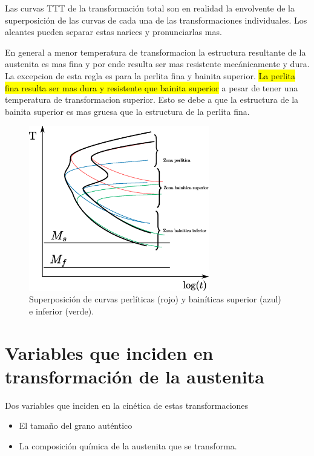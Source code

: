 \documentclass{article}
\begin{document}
Las curvas TTT de la transformación total son en realidad la envolvente de la superposición de las curvas de cada una de las transformaciones individuales. Los aleantes pueden separar estas narices y pronunciarlas mas.

En general a menor temperatura de transformacion la estructura resultante de la austenita es mas fina y por ende resulta ser mas resistente mecánicamente y dura. La excepcion de esta regla es para la perlita fina y bainita superior. \hl{La perlita fina resulta ser mas dura y resistente que bainita superior} a pesar de tener una temperatura de transformacion superior. Esto se debe a que la estructura de la bainita superior es mas gruesa que la estructura de la perlita fina.

\begin{figure}[htb!]
    \centering
    \includegraphics[width=0.7\textwidth]{fig/TTTsuperpuesta.eps}
    \caption{Superposición de curvas perlíticas (rojo) y bainíticas superior (azul) e inferior (verde).}
    \label{fig:TTTsuperpuestas}
\end{figure}

\section{Variables que inciden en transformación de la austenita}
Dos variables que inciden en la cinética de estas transformaciones
\begin{itemize}
    \item El tamaño del grano auténtico
    \item La composición química de la austenita que se transforma.
\end{itemize}
\end{document}
